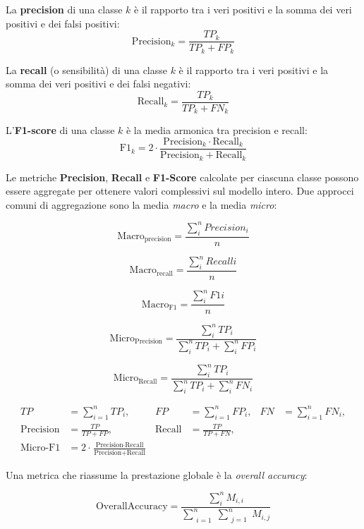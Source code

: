La \textbf{precision} di una classe $k$ è il rapporto tra i veri positivi e la
somma dei veri positivi e dei falsi positivi:
\[
    \mathrm{Precision}_k = \frac{TP_k}{TP_k + FP_k}
\]

La \textbf{recall} (o sensibilità) di una classe $k$ è il rapporto tra i veri
positivi e la somma dei veri positivi e dei falsi negativi:
\[
    \mathrm{Recall}_k = \frac{TP_k}{TP_k + FN_k}
\]

L'\textbf{F1-score} di una classe $k$ è la media armonica tra precision e recall:
\[
    \mathrm{F1}_k = 2 \cdot \frac{\mathrm{Precision}_k \cdot \mathrm{Recall}_k}
    {\mathrm{Precision}_k + \mathrm{Recall}_k}
\]

Le metriche \textbf{Precision}, \textbf{Recall} e \textbf{F1-Score} calcolate per ciascuna classe
possono essere aggregate per ottenere valori complessivi sul modello intero. Due approcci
comuni di aggregazione sono la media \textit{macro} e la media \textit{micro}:

\[
    \mathrm{Macro_{precision}} = \frac{\sum_{i}^{n} Precision_{i}}{n}
\]

\[
    \mathrm{Macro_{recall}} = \frac{\sum_{i}^{n} Recall{i}}{n}
\]

\[
    \mathrm{Macro_{F1}} = \frac{\sum_{i}^{n} F1{i}}{n}
\]

\[
    \mathrm{Micro_{Precision}} = \frac{\sum_{i}^{n} TP_{i}}{\sum_{i}^{n} TP_{i} + \sum_{i}^{n} FP_{i}}
\]

\[
    \mathrm{Micro_{Recall}} = \frac{\sum_{i}^{n} TP_{i}}{\sum_{i}^{n} TP_{i} + \sum_{i}^{n} FN_{i}}
\]

\[
    \begin{aligned}
        TP               & = \sum_{i=1}^{n} TP_i,                                                                  & FP            & = \sum_{i=1}^{n} FP_i, & FN & = \sum_{i=1}^{n} FN_i, \\[1mm]
        \text{Precision} & = \frac{TP}{TP + FP},                                                                   & \text{Recall} & = \frac{TP}{TP + FN},                                \\[1mm]
        \text{Micro-F1}  & = 2 \cdot \frac{\text{Precision} \cdot \text{Recall}}{\text{Precision} + \text{Recall}}
    \end{aligned}
\]

Una metrica che riassume la prestazione globale è la \textit{overall accuracy}:

\[
    \mathrm{OverallAccuracy} = \frac{\sum_{i}^{n} M_{i,i}}{ \sum_{\substack{i=1}}^{n}
        \sum_{\substack{j=1 }}^{n} M_{i,j}}
\]
